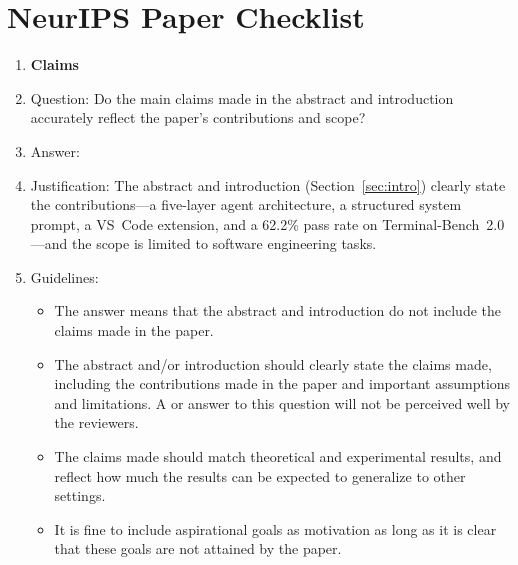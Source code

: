 \documentclass{article}
\begin{document}
\section*{NeurIPS Paper Checklist}

\begin{enumerate}

\item {\bf Claims}
    \item[] Question: Do the main claims made in the abstract and introduction accurately reflect the paper's contributions and scope?
    \item[] Answer: \answerYes{}
    \item[] Justification: The abstract and introduction (Section~\ref{sec:intro}) clearly state the contributions---a five-layer agent architecture, a structured system prompt, a VS~Code extension, and a 62.2\% pass rate on Terminal-Bench~2.0---and the scope is limited to software engineering tasks.
    \item[] Guidelines:
    \begin{itemize}
        \item The answer \answerNA{} means that the abstract and introduction do not include the claims made in the paper.
        \item The abstract and/or introduction should clearly state the claims made, including the contributions made in the paper and important assumptions and limitations. A \answerNo{} or \answerNA{} answer to this question will not be perceived well by the reviewers. 
        \item The claims made should match theoretical and experimental results, and reflect how much the results can be expected to generalize to other settings. 
        \item It is fine to include aspirational goals as motivation as long as it is clear that these goals are not attained by the paper. 
    \end{itemize}


\end{enumerate}
\end{document}
